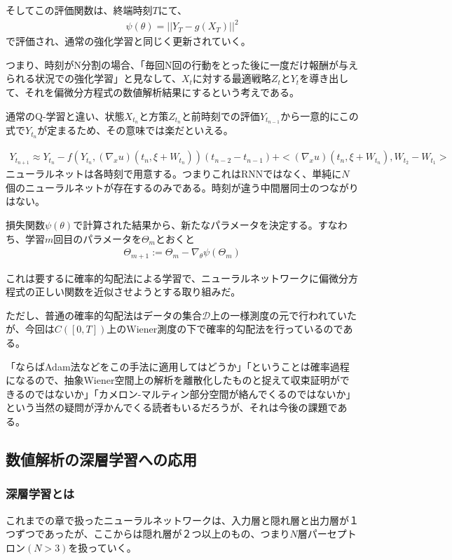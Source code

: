 \documentclass[dvipdfmx, a4paper]{jsarticle}
\begin{document}
そしてこの評価関数は、終端時刻$T$にて、
\begin{align}
\psi(\theta)=||Y_T-g(X_T)||^2
\end{align}
で評価され、通常の強化学習と同じく更新されていく。

つまり、時刻がN分割の場合、「毎回N回の行動をとった後に一度だけ報酬が与えられる状況での強化学習」と見なして、$X_t$に対する最適戦略$Z_t$と$Y_t$を導き出して、それを偏微分方程式の数値解析結果にするという考えである。

通常のQ-学習と違い、状態$X_{t_n}$と方策$Z_{t_n}$と前時刻での評価$Y_{t_{n-1}}$から一意的にこの式で$Y_{t_n}$が定まるため、その意味では楽だといえる。

\begin{align}
Y_{t_{n+1}}\approx Y_{t_n}-f(Y_{t_n},(\nabla_xu)(t_n,\xi+W_{t_n}))(t_{n-2}-t_{n-1})+<(\nabla_xu)(t_n,\xi+W_{t_n}),W_{t_2}-W_{t_1}>
\end{align}
ニューラルネットは各時刻で用意する。つまりこれはRNNではなく、単純に$N$個のニューラルネットが存在するのみである。時刻が違う中間層同士のつながりはない。

損失関数$\psi(\theta)$で計算された結果から、新たなパラメータを決定する。すなわち、学習$m$回目のパラメータを$\Theta_m$とおくと
\begin{align}
\Theta_{m+1}:=\Theta_{m}-\nabla_\theta\psi(\Theta_m)
\end{align}

これは要するに確率的勾配法による学習で、ニューラルネットワークに偏微分方程式の正しい関数を近似させようとする取り組みだ。

ただし、普通の確率的勾配法はデータの集合$\mathcal{D}$上の一様測度の元で行われていたが、今回は$C([0,T])$上のWiener測度の下で確率的勾配法を行っているのである。

「ならばAdam法などをこの手法に適用してはどうか」「ということは確率過程になるので、抽象Wiener空間上の解析を離散化したものと捉えて収束証明ができるのではないか」「カメロン-マルティン部分空間が絡んでくるのではないか」という当然の疑問が浮かんでくる読者もいるだろうが、それは今後の課題である。

\subsection{数値解析の深層学習への応用}

\subsubsection{深層学習とは}
これまでの章で扱ったニューラルネットワークは、入力層と隠れ層と出力層が１つずつであったが、ここからは隠れ層が２つ以上のもの、つまり$N$層パーセプトロン$(N>3)$を扱っていく。
\end{document}
